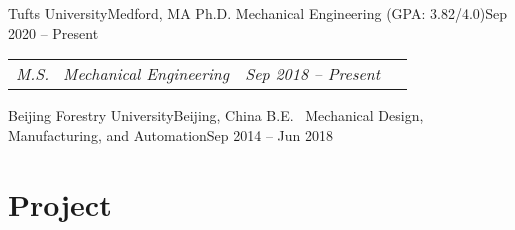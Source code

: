 \documentclass[letterpaper,11pt]{article}
\begin{document}
\newcommand{\EduRoleNoHead}[2]{
  \vspace{-5pt}\item[]
    \begin{tabular*}{1\textwidth}[t]{l@{\extracolsep{\fill}}r}
    \textit{#1} & \textit{\small #2} \\
    \end{tabular*}\vspace{-14pt}}
    
\BeginEduList
    \EduRole
      {Tufts University}{Medford, MA}
      {Ph.D. Mechanical Engineering \footnotesize{(GPA: 3.82/4.0)}}{Sep 2020 -- Present~~\,}
    \EduRoleNoHead
      {M.S.~ Mechanical Engineering}{Sep 2018 -- Present~~\,}
    \EduRole
      {Beijing Forestry University}{Beijing, China}
      {B.E.~ Mechanical Design, Manufacturing, and Automation}{Sep 2014 -- Jun 2018}
\EndEduList


\section{Project} %

\newcommand{\ProjList}{\begin{itemize}[leftmargin=0.00in]}
\newcommand{\ProjListEnd}{\end{itemize}\vspace{-5pt}}

\newcommand{\ProjHead}[2]{ %
  \vspace{0pt}\item[]
    \begin{tabular*}{1\textwidth}[t]{l@{\extracolsep{\fill}}r}
    \textbf{#1}&{\small{\textit{#2}}} \\
    \end{tabular*}\vspace{-3pt}
}

\newcommand{\ProjListII}{\begin{itemize}[leftmargin=0in]} 
\newcommand{\ProjListIIEnd}{\end{itemize}\vspace{-5pt}}

\newcommand{\ProjBullet}[1]
{\item\small\justifying{\vspace{-3pt}{\hspace{0pt}#1\vspace{0pt}}}}
\end{document}
